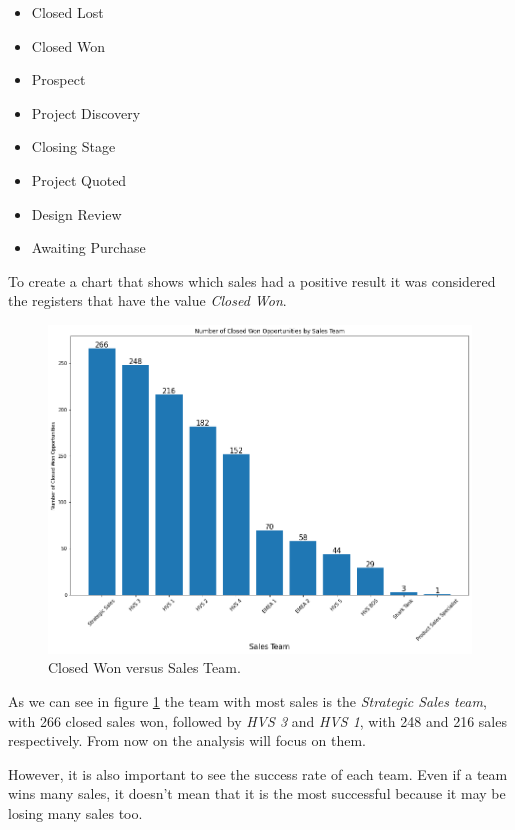 \documentclass[]{report}
\begin{document}
\begin{itemize}
	\item Closed Lost
	\item Closed Won
	\item Prospect
	\item Project Discovery
	\item Closing Stage
	\item Project Quoted
	\item Design Review
	\item Awaiting Purchase
\end{itemize}

To create a chart that shows which sales had a positive result it was considered the registers that have the value \textit{Closed Won}.

\begin{figure}[htb]
	\centering
	\includegraphics[width=1\textwidth]{fig_01_closed_won}
	\caption{Closed Won versus Sales Team.}
	\label{fig:fig_01}
\end{figure}

As we can see in figure \textcolor{blue}{\ref{fig:fig_01}} the team with most sales is the \textit{Strategic Sales team}, with 266 closed sales won, followed by \textit{HVS 3} and \textit{HVS 1}, with 248 and 216 sales respectively. From now on the analysis will focus on them.

However, it is also important to see the success rate of each team. Even if a team wins many sales, it doesn't mean that it is the most successful because it may be losing many sales too.
\end{document}

